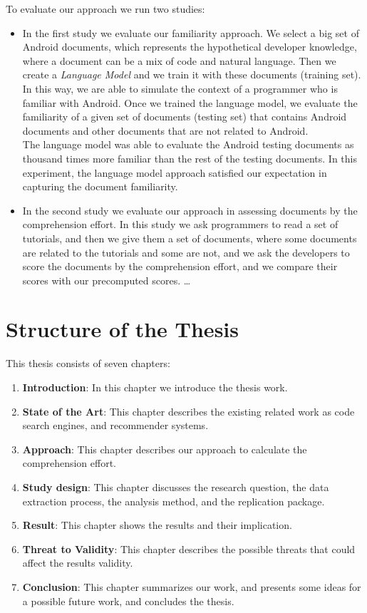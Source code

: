 \documentclass[12pt,mscthesis]{usiinfthesis}
\begin{document}
	To evaluate our approach we run two studies:
	\begin{itemize}

	 \item In the first study we evaluate our familiarity approach. We select a big set of Android documents, which represents the hypothetical developer knowledge, where a document can be a mix of code and natural language. Then we create a \emph{ Language Model} \cite{Hindle:2012:NS:2337223.2337322} and we train it with these documents (training set). In this way, we are able to simulate the context of a programmer who is familiar with Android. Once we trained the language model, we evaluate the familiarity of a given set of documents (testing set) that contains Android documents and other documents that are not related to Android.\\ 
	 The language model was able to evaluate the Android testing documents as thousand times more familiar than the rest of the testing documents.
	 In this experiment, the language model approach satisfied our expectation in capturing the document familiarity.\\

	 \item In the second study we evaluate our approach in assessing documents by the comprehension effort. In this study we ask programmers to read a set of tutorials, and then we give them a set of documents, where some documents are related to the tutorials and some are not, and we ask the developers to score the documents by the comprehension effort, and we compare their scores with our precomputed scores.
	 \dots 
	\end{itemize}

	\section{Structure of the Thesis}
	This thesis consists of seven chapters: 
	\begin{enumerate}
	
		\item \textbf{Introduction}: In this chapter we introduce the thesis work.
		\item \textbf{State of the Art}: This chapter describes the existing related work as code search engines, and recommender systems.
		\item \textbf{Approach}: This chapter describes our approach to calculate the comprehension effort.
		\item \textbf{Study design}: This chapter discusses the research question, the data extraction process, the analysis method, and the replication package.
		\item \textbf{Result}: This chapter shows the results and their implication.
		\item \textbf{Threat to Validity}: This chapter describes the possible threats that could affect the results validity.
		\item \textbf{Conclusion}: This chapter summarizes our work, and presents some ideas for a possible future work, and concludes the thesis.
	\end{enumerate}
\end{document}
